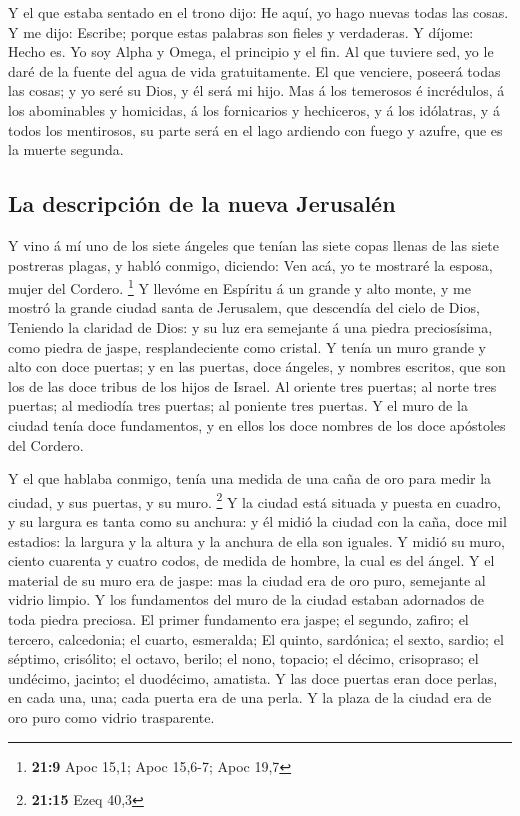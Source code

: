 Y el que estaba sentado en el trono dijo: He aquí, yo
hago nuevas todas las cosas. Y me dijo: Escribe; porque estas palabras
son fieles y verdaderas.  Y díjome: Hecho es. Yo soy Alpha
y Omega, el principio y el fin. Al que tuviere sed, yo le daré de la
fuente del agua de vida gratuitamente.  El que venciere,
poseerá todas las cosas; y yo seré su Dios, y él será mi hijo.
 Mas á los temerosos é incrédulos, á los abominables y
homicidas, á los fornicarios y hechiceros, y á los idólatras, y á todos
los mentirosos, su parte será en el lago ardiendo con fuego y azufre,
que es la muerte segunda.

\hypertarget{la-descripciuxf3n-de-la-nueva-jerusaluxe9n}{%
\subsection{La descripción de la nueva
Jerusalén}\label{la-descripciuxf3n-de-la-nueva-jerusaluxe9n}}

 Y vino á mí uno de los siete ángeles que tenían las siete
copas llenas de las siete postreras plagas, y habló conmigo, diciendo:
Ven acá, yo te mostraré la esposa, mujer del Cordero. \footnote{\textbf{21:9}
  Apoc 15,1; Apoc 15,6-7; Apoc 19,7}  Y llevóme en
Espíritu á un grande y alto monte, y me mostró la grande ciudad santa de
Jerusalem, que descendía del cielo de Dios,  Teniendo la
claridad de Dios: y su luz era semejante á una piedra preciosísima, como
piedra de jaspe, resplandeciente como cristal.  Y tenía
un muro grande y alto con doce puertas; y en las puertas, doce ángeles,
y nombres escritos, que son los de las doce tribus de los hijos de
Israel.  Al oriente tres puertas; al norte tres puertas;
al mediodía tres puertas; al poniente tres puertas.  Y el
muro de la ciudad tenía doce fundamentos, y en ellos los doce nombres de
los doce apóstoles del Cordero.

 Y el que hablaba conmigo, tenía una medida de una caña
de oro para medir la ciudad, y sus puertas, y su muro. \footnote{\textbf{21:15}
  Ezeq 40,3}  Y la ciudad está situada y puesta en
cuadro, y su largura es tanta como su anchura: y él midió la ciudad con
la caña, doce mil estadios: la largura y la altura y la anchura de ella
son iguales.  Y midió su muro, ciento cuarenta y cuatro
codos, de medida de hombre, la cual es del ángel.  Y el
material de su muro era de jaspe: mas la ciudad era de oro puro,
semejante al vidrio limpio.  Y los fundamentos del muro
de la ciudad estaban adornados de toda piedra preciosa. El primer
fundamento era jaspe; el segundo, zafiro; el tercero, calcedonia; el
cuarto, esmeralda;  El quinto, sardónica; el sexto,
sardio; el séptimo, crisólito; el octavo, berilo; el nono, topacio; el
décimo, crisopraso; el undécimo, jacinto; el duodécimo, amatista.
 Y las doce puertas eran doce perlas, en cada una, una;
cada puerta era de una perla. Y la plaza de la ciudad era de oro puro
como vidrio trasparente.


